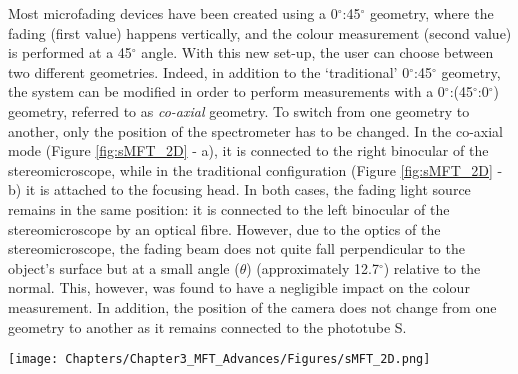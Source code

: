 Most microfading devices have been created using a 0$^\circ$:45$^\circ$ geometry, where the fading (first value) happens vertically, and the colour measurement (second value) is performed at a 45$^\circ$ angle. With this new set-up, the user can choose between two different geometries. Indeed, in addition to the ‘traditional’ 0$^\circ$:45$^\circ$ geometry, the system can be modified in order to perform measurements with a 0$^\circ$:(45$^\circ$:0$^\circ$) geometry, referred to as \textit{co-axial} geometry. To switch from one geometry to another, only the position of the spectrometer has to be changed. In the co-axial mode (Figure \ref{fig:sMFT_2D} - a), it is connected to the right binocular of the stereomicroscope, while in the traditional configuration (Figure \ref{fig:sMFT_2D} - b) it is attached to the focusing head. In both cases, the fading light source remains in the same position: it is connected to the left binocular of the stereomicroscope by an optical fibre. However, due to the optics of the stereomicroscope, the fading beam does not quite fall perpendicular to the object's surface but at a small angle ($\theta$) (approximately 12.7$^\circ$) relative to the normal. This, however, was found to have a negligible impact on the colour measurement. In addition, the position of the camera does not change from one geometry to another as it remains connected to the phototube S.\\

\begin{figure*}[!h]
\centering
\texttt{[image: Chapters/Chapter3\_MFT\_Advances/Figures/sMFT\_2D.png]}
\caption[\hspace{0.3cm}2D representation of the stereo-MFT]{2D representation of the stereo-MFT: (a) co-axial mode and (b) traditional mode.}
\label{fig:sMFT_2D}
\end{figure*}

